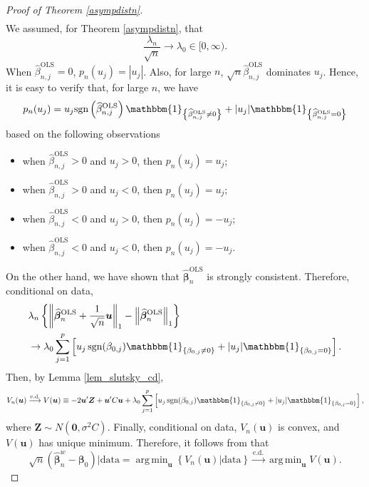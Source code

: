 \documentclass[12pt]{article}
\DeclareMathOperator*{\argmin}{arg\,min} %
\newcommand{\bnw}{\widehat{\bm{\beta}}_n^w} %
\newcommand{\bLS}{\widehat{\bm{\beta}}_n^{\text{OLS}}} %
\newcommand{\be}{\bm{\beta}} %
\newcommand{\dqn}{\dfrac{1}{\sqrt{n}}} %
\newcommand{\CONV}[1]{\stackrel{\text{#1}}{\longrightarrow}} %
\newcommand{\bu}{\bm{u}} %
\begin{document}
\begin{proof} [Proof of Theorem \ref{asympdistn}]
\begin{align*}
	\end{align*}
	We assumed, for Theorem \ref{asympdistn}, that 
	$$
	\dfrac{\lambda_n}{\sqrt{n}} \to \lambda_0 \in [0, \infty).
	$$
	When $\widehat{\beta}_{n,j}^{\text{OLS}} = 0$, $p_n(u_j) = |u_j|$. Also, for large $n$, $\sqrt{n} \widehat{\beta}_{n,j}^{\text{OLS}}$ dominates $u_j$. Hence, it is easy to verify that, for large $n$, we have
	$$
	p_n(u_j) = u_j 
				\text{sgn} 
				\left( \widehat{\beta}_{n,j}^{\text{OLS}} \right)
				\mathbbm{1}_{ 
							\left\{ 
									\widehat{\beta}_{n,j}^{\text{OLS}} \neq 0 
							\right\} 
							}
			+ |u_j| 
				\mathbbm{1}_{
							\left\{
								\widehat{\beta}_{n,j}^{\text{OLS}} = 0
							\right\} 
							}
	$$
	based on the following observations
	\begin{itemize}
		\item when $\widehat{\beta}_{n,j}^{\text{OLS}} >0$ and $u_j >0$, then $p_n(u_j) = u_j$; \\
		\item when $\widehat{\beta}_{n,j}^{\text{OLS}} >0$ and $u_j <0$, then $p_n(u_j) = u_j$; \\
		\item when $\widehat{\beta}_{n,j}^{\text{OLS}} <0$ and $u_j >0$, then $p_n(u_j) = -u_j$; \\
		\item when $\widehat{\beta}_{n,j}^{\text{OLS}} <0$ and $u_j <0$, then $p_n(u_j) = -u_j$. \\ 
	\end{itemize}  
	On the other hand, we have shown that $\bLS$ is strongly consistent. Therefore, conditional on data,
	\begin{align*}
	&\lambda_n \left\{
					\left\| \bLS + \dqn \bu \right\|_1
					- \left\| \bLS \right\|_1 
				\right\} \\
	&\to \lambda_0
		 \sum_{j=1}^p
		 \left[
				u_j \, \text{sgn}(\beta_{0,j}) \mathbbm{1}_{ \{ \beta_{0,j} \neq 0 \}}
				+ | u_j | \mathbbm{1}_{ \{ \beta_{0,j} = 0 \}} 
		 \right]. 
	\end{align*}
	Then, by Lemma \ref{lem_slutsky_cd}, 
	$$
	V_n(\bu) \CONV{c.d.}  V(\bu) \equiv 
	-2 \bu' \bm{Z} 
	+ \bu' C \bu
	+ \lambda_0 
	  \sum_{j=1}^p
	  \left[
	  		u_j \, \text{sgn}(\beta_{0,j}) \mathbbm{1}_{ \{ \beta_{0,j} \neq 0 \}}
	  		+ | u_j | \mathbbm{1}_{ \{ \beta_{0,j} = 0 \}} 
	  \right], 
	$$
	where $\bm{Z} \sim N \left( \bm{0}, \sigma^2 C \right)$. Finally, conditional on data, $V_n(\bu)$ is convex, and $V(\bu)$ has unique minimum. Therefore, it follows from \citet{Geyer1996} that
	$$
	\sqrt{n} \left( \bnw - \be_0 \right) \bigg| \text{data}
	= \argmin_{\bu} \left\{ V_n(\bu) \big| \text{data} \right\}
	\CONV{c.d.}
	\argmin_{\bu} V(\bu).
	$$  
\end{proof}
   
     
         
\end{document}
